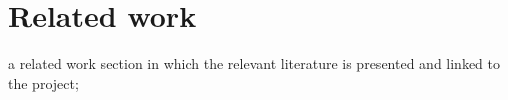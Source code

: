 \chapter{Related work}
\label{chap:rw}

a related work section in which the relevant literature is presented and linked to the project;